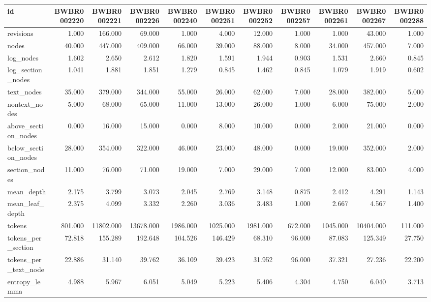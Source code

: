 \begin{tabular}{lrrrrrrrrrr}
\toprule
id & BWBR0002220 & BWBR0002221 & BWBR0002226 & BWBR0002240 & BWBR0002251 & BWBR0002252 & BWBR0002257 & BWBR0002261 & BWBR0002267 & BWBR0002288 \\
\midrule
revisions & 1.000 & 166.000 & 69.000 & 1.000 & 4.000 & 12.000 & 1.000 & 1.000 & 43.000 & 1.000 \\
\cline{1-11}
nodes & 40.000 & 447.000 & 409.000 & 66.000 & 39.000 & 88.000 & 8.000 & 34.000 & 457.000 & 7.000 \\
\cline{1-11}
log\_nodes & 1.602 & 2.650 & 2.612 & 1.820 & 1.591 & 1.944 & 0.903 & 1.531 & 2.660 & 0.845 \\
\cline{1-11}
log\_section\_nodes & 1.041 & 1.881 & 1.851 & 1.279 & 0.845 & 1.462 & 0.845 & 1.079 & 1.919 & 0.602 \\
\cline{1-11}
text\_nodes & 35.000 & 379.000 & 344.000 & 55.000 & 26.000 & 62.000 & 7.000 & 28.000 & 382.000 & 5.000 \\
\cline{1-11}
nontext\_nodes & 5.000 & 68.000 & 65.000 & 11.000 & 13.000 & 26.000 & 1.000 & 6.000 & 75.000 & 2.000 \\
\cline{1-11}
above\_section\_nodes & 0.000 & 16.000 & 15.000 & 0.000 & 8.000 & 10.000 & 0.000 & 2.000 & 21.000 & 0.000 \\
\cline{1-11}
below\_section\_nodes & 28.000 & 354.000 & 322.000 & 46.000 & 23.000 & 48.000 & 0.000 & 19.000 & 352.000 & 2.000 \\
\cline{1-11}
section\_nodes & 11.000 & 76.000 & 71.000 & 19.000 & 7.000 & 29.000 & 7.000 & 12.000 & 83.000 & 4.000 \\
\cline{1-11}
mean\_depth & 2.175 & 3.799 & 3.073 & 2.045 & 2.769 & 3.148 & 0.875 & 2.412 & 4.291 & 1.143 \\
\cline{1-11}
mean\_leaf\_depth & 2.375 & 4.099 & 3.332 & 2.260 & 3.036 & 3.483 & 1.000 & 2.667 & 4.567 & 1.400 \\
\cline{1-11}
tokens & 801.000 & 11802.000 & 13678.000 & 1986.000 & 1025.000 & 1981.000 & 672.000 & 1045.000 & 10404.000 & 111.000 \\
\cline{1-11}
tokens\_per\_section & 72.818 & 155.289 & 192.648 & 104.526 & 146.429 & 68.310 & 96.000 & 87.083 & 125.349 & 27.750 \\
\cline{1-11}
tokens\_per\_text\_node & 22.886 & 31.140 & 39.762 & 36.109 & 39.423 & 31.952 & 96.000 & 37.321 & 27.236 & 22.200 \\
\cline{1-11}
entropy\_lemma & 4.988 & 5.967 & 6.051 & 5.049 & 5.223 & 5.406 & 4.304 & 4.750 & 6.040 & 3.713 \\

\end{tabular}
